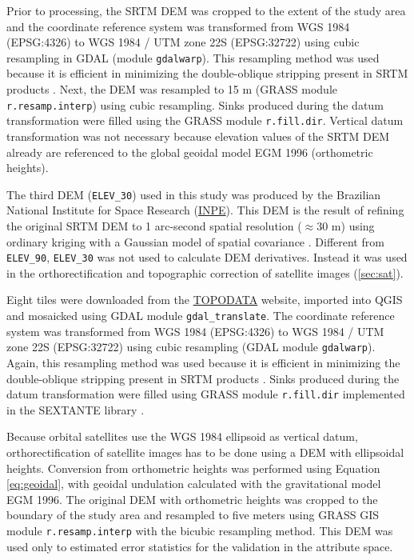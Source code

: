 Prior to processing, the SRTM DEM was cropped to the extent of the study area and the coordinate reference system was transformed from WGS 1984 (EPSG:4326) to WGS 1984 / UTM zone 22S (EPSG:32722) using cubic resampling in GDAL (module \texttt{gdalwarp}). This resampling method was used because it is efficient in minimizing the double-oblique stripping present in SRTM products \cite{Samuel-RosaEtAl2013c}. Next, the DEM was resampled to 15 m (GRASS module \texttt{r.resamp.interp}) using cubic resampling. Sinks produced during the datum transformation were filled using the GRASS module \texttt{r.fill.dir}. Vertical datum transformation was not necessary because elevation values of the SRTM DEM already are referenced to the global geoidal model EGM 1996 (orthometric heights).

The third DEM (\texttt{ELEV\_30}) used in this study was produced by the Brazilian National Institute for Space Research (\href{http://www.inpe.br/}{INPE}). This DEM is the result of refining the original SRTM DEM to 1 arc-second spatial resolution ($\approx$30 m) using ordinary kriging with a Gaussian model of spatial covariance \cite{ValerianoEtAl2012}. Different from \texttt{ELEV\_90}, \texttt{ELEV\_30} was not used to calculate DEM derivatives. Instead it was used in the orthorectification and topographic correction of satellite images (\ref{sec:sat}).

Eight tiles were downloaded from the \href{http://www.dsr.inpe.br/topodata/}{TOPODATA} website, imported into QGIS and mosaicked using GDAL module \texttt{gdal\_translate}. The coordinate reference system was transformed from WGS 1984 (EPSG:4326) to WGS 1984 / UTM zone 22S (EPSG:32722) using cubic resampling (GDAL module \texttt{gdalwarp}). Again, this resampling method was used because it is efficient in minimizing the double-oblique stripping present in SRTM products \cite{Samuel-RosaEtAl2013c}. Sinks produced during the datum transformation were filled using GRASS module \texttt{r.fill.dir} implemented in the SEXTANTE library \cite{SEXTANTE2012}.

Because orbital satellites use the WGS 1984 ellipsoid as vertical datum, orthorectification of satellite images has to be done using a DEM with ellipsoidal heights. Conversion from orthometric heights was performed using Equation \ref{eq:geoidal}, with geoidal undulation calculated with the gravitational model EGM 1996. The original DEM with orthometric heights was cropped to the boundary of the study area and resampled to five meters using GRASS GIS module \texttt{r.resamp.interp} with the bicubic resampling method. This DEM was used only to estimated error statistics for the validation in the attribute space.

